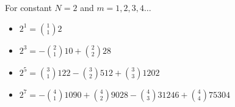 For constant $N=2$ and $m=1,2,3,4\dots$
\begin{itemize}
    \item $2^1 = \binom{1}{1} 2$
    \item $2^3 = -\binom{2}{1} 10 + \binom{2}{2} 28$
    \item $2^5 = \binom{3}{1} 122 - \binom{3}{2} 512 + \binom{3}{3} 1202$
    \item $2^7 = - \binom{4}{1} 1090 + \binom{4}{2} 9028 - \binom{4}{3} 31246 + \binom{4}{4} 75304$
\end{itemize}
